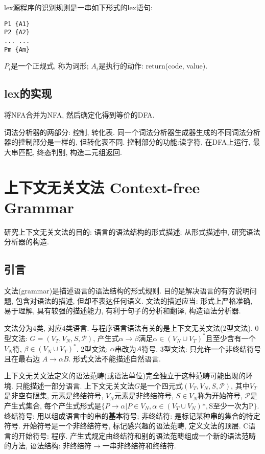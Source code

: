         lex源程序的识别规则是一串如下形式的lex语句:
\begin{verbatim}
P1 {A1}
P2 {A2}
... ...
Pm {Am}
\end{verbatim}

        $P_i$是一个正规式, 称为\textsf{词形}; $A_i$是执行的动作: return(code, value).

    \subsection{lex的实现}

        将NFA合并为NFA, 然后确定化得到等价的DFA. 

        词法分析器的两部分: 控制, 转化表. 同一个词法分析器生成器生成的不同词法分析器的控制部分是一样的, 但转化表不同. 控制部分的功能:读字符, 在DFA上运行, 最大串匹配, 终态判别, 构造二元组返回.

\section{上下文无关文法 Context-free Grammar}

    研究上下文无关文法的目的: 语言的语法结构的形式描述; 从形式描述中, 研究语法分析器的构造.


    \subsection{引言}

        \textsf{文法(grammar)}是描述语言的语法结构的形式规则. 目的是解决语言的有穷说明问题, 包含对语法的描述, 但却不表达任何语义. 文法的描述应当: 形式上严格准确, 易于理解, 具有较强的描述能力, 有利于句子的分析和翻译, 构造语法分析器.

        文法分为4类, 对应4类语言. 与程序语言语法有关的是上下文无关文法(2型文法). 0型文法: $G=(V_T, V_N, S, \mathcal{P})$, 产生式$\alpha\to\beta$满足$\alpha\in(V_N\cup V_T)^*$且至少含有一个$V_N$符, $\beta\in(V_N\cup V_T)^*$. 2型文法: $\alpha$串改为$A$符号. 3型文法: 只允许一个非终结符号且在最右边 $A\to\alpha B$. 形式文法不能描述自然语言.

        \textsf{上下文无关文法}定义的语法范畴(或语法单位)完全独立于这种范畴可能出现的环境. 只能描述一部分语言. 上下文无关文法$G$是一个四元式$(V_T,V_N,S,\mathcal{P})$, 其中$V_T$是非空有限集, 元素是终结符号, $V_N$元素是非终结符号, $S\in V_N$称为开始符号, $\mathcal{P}$是产生式集合, 每个产生式形式是$\{P\to\alpha|P\in V_N, \alpha\in(V_T\cup V_N)*, \textrm{S至少一次为P}\}$. \textsf{终结符号}: 用以组成语言中的串的\textbf{基本}符号; \textsf{非终结符}: 是标记某种\textbf{串}的集合的特定符号. \textsf{开始符号}是一个非终结符号, 标记感兴趣的语法范畴, 定义文法的顶层. C语言的开始符号: 程序. \textsf{产生式}规定由终结符和别的语法范畴组成一个新的语法范畴的方法, 语法结构: 非终结符$\to$一串非终结符和终结符. 


